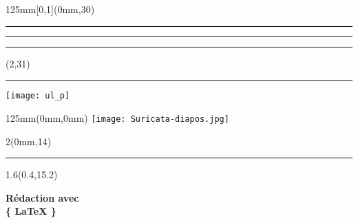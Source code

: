 \begingroup

\textblockorigin{0mm}{0mm}
\setlength{\parindent}{0mm}
\setlength{\banderougewidth}{2\TPHorizModule}
\setlength{\banderougeheight}{\TPVertModule}
\setlength{\bandeorwidth}{\TPHorizModule}
\setlength{\bandeorheight}{\banderougeheight}
\setlength{\imageheight}{29\TPVertModule}
\setlength{\logoheight}{2.5\TPVertModule}
\setlength{\gapwidth}{0.75pt}
\addtolength{\bandeorwidth}{-\gapwidth}
\addtolength{\imageheight}{-\gapwidth}

\begin{frame}[plain]
  \begin{textblock*}{125mm}[0,1](0mm,30\TPVertModule)
    \textcolor{rouge}{\rule{\banderougewidth}{\banderougeheight}}%
    \rule{\gapwidth}{0pt}%
    \textcolor{or}{\rule{\bandeorwidth}{\bandeorheight}}           %
  \end{textblock*}

  \begin{textblock*}{\TPHorizModule}(2\TPHorizModule,31\TPVertModule)
    \rule{\gapwidth}{0pt}%
    \texttt{[image: ul\_p]}
  \end{textblock*}



  \begin{textblock*}{125mm}(0mm,0mm)
    \texttt{[image: Suricata-diapos.jpg]}
  \end{textblock*}

  \begin{textblock*}{2\TPHorizModule}(0mm,14\TPVertModule)
    \textcolor{white}{\rule{\linewidth}{10\TPVertModule}}
  \end{textblock*}

  \begin{textblock*}{1.6\TPHorizModule}(0.4\TPHorizModule,15.2\TPVertModule)
    \raggedright%
    \titles\bfseries
    \fontsize{20}{20}\selectfont
    Rédaction avec \\
    \rmfamily\mdseries
    \fontsize{22.5}{22.5}\selectfont
    \fontsize{40}{40}\selectfont%
    \{%
    \fontsize{35}{35}\selectfont%
    \LaTeX
    \fontsize{40}{40}\selectfont%
    \}
  \end{textblock*}


\end{frame}
